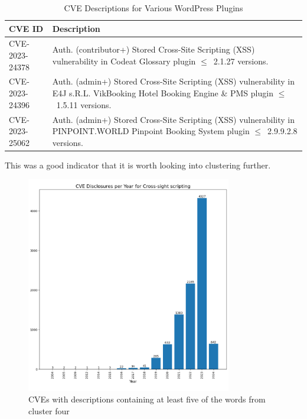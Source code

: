 \documentclass[12pt]{article}
\begin{document}
\begin{table}[h]
	\centering
	\begin{tabular}{|p{}|p{}|}
		\hline
		\textbf{CVE ID} & \textbf{Description}                                                    \\
		\hline

		CVE-2023-24378  & Auth. (contributor+) Stored Cross-Site Scripting (XSS) vulnerability in
		Codeat Glossary plugin $\leq$~2.1.27 versions.                                            \\

		\hline

		CVE-2023-24396  & Auth. (admin+) Stored Cross-Site Scripting (XSS) vulnerability in E4J
		s.R.L. VikBooking Hotel Booking Engine \& PMS plugin $\leq$~1.5.11 versions.              \\

		\hline

		CVE-2023-25062  & Auth. (admin+) Stored Cross-Site Scripting (XSS) vulnerability in
		PINPOINT.WORLD Pinpoint Booking System plugin $\leq$~2.9.9.2.8 versions.                  \\

		\hline
	\end{tabular}
	\caption{CVE Descriptions for Various WordPress Plugins}
	\label{tab:cve-descriptions}
\end{table}

This was a good indicator that it is worth looking into clustering further.

\begin{figure}[H]
	\centering

	\includegraphics[width=0.8\textwidth]{figures/cross_site_per_year.pdf}
	\caption{\label{fig:cross_site_per_year}CVEs with descriptions containing at least five of the
		words from cluster four}
\end{figure}
\end{document}
